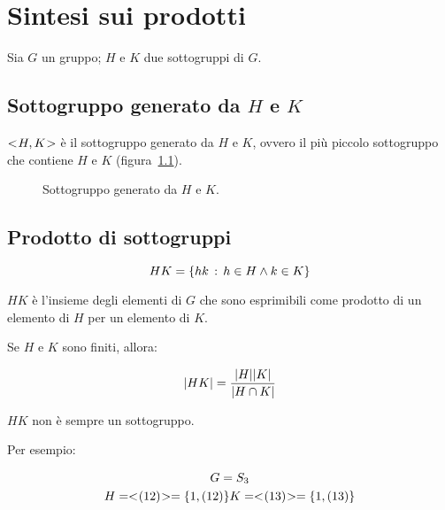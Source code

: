 \chapter{Sintesi sui prodotti}

Sia $G$ un gruppo; $H$ e $K$ due sottogruppi di $G$.

\section{Sottogruppo generato da $H$ e $K$}

$< \negmedspace H, K \negmedspace >$ è il sottogruppo generato da $H$ e $K$, ovvero il più piccolo sottogruppo che contiene $H$ e $K$ (figura~\ref{fig:sottogruppo_generato_da_h_e_k}).

\begin{figure}[tp]
	\centering
	\caption{Sottogruppo generato da $H$ e $K$.}
	\label{fig:sottogruppo_generato_da_h_e_k}
\end{figure} 

\section{Prodotto di sottogruppi}

\begin{equation}
	HK = \{hk \,:\, h \in H \land k \in K\}
\end{equation}

$HK$ è l'insieme degli elementi di $G$ che sono esprimibili come prodotto di un elemento di $H$ per un elemento di $K$.

\begin{teorema}
	Se $H$ e $K$ sono finiti, allora:
	
	\begin{equation}
		\lvert HK \rvert = \dfrac{\lvert H \rvert\lvert K \rvert}{\lvert H \cap K \rvert}
	\end{equation}
\end{teorema}

$HK$ non è sempre un sottogruppo.

Per esempio:

\begin{gather}
	G = S_3 \\
	H = < \negmedspace (12) \negmedspace > = \{1, (12)\}
	K = < \negmedspace (13) \negmedspace > = \{1, (13)\} 
\end{gather}

